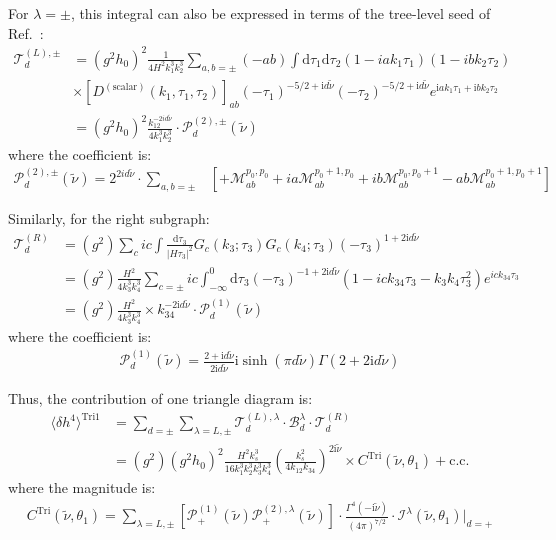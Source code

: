 \documentclass[a4paper,12pt]{article}
\def\di{{\mathrm{d}}}
\def\mc{\mathcal}
\def\la{\langle}\def\ra{\rangle}
\def\ii{\mathrm{i}}
\def\lam{\lambda}
\def\tn{\tilde\nu}
\begin{document}
For $\lambda=\pm$, this integral can also be expressed in terms of the tree-level seed of Ref.~\cite{qin_closed-form_2023}:
\begin{align}
    \mathcal{T}^{(L),\pm}_d 
    &= (g^2h_0)^2  
    \frac{1}{4H^2k_1^3 k_2^3}
    \sum_{a,b=\pm} (-ab)
    \int \di \tau_1 \di \tau_2 
    (1-iak_1\tau_1)(1-ibk_2\tau_2)
    \nonumber \\
    &\times \left[D^{(\text{scalar})}(k_1,\tau_1,\tau_2)\right]_{ab} 
    (-\tau_1)^{-5/2+\ii d\tn}
    (-\tau_2)^{-5/2+\ii d\tn} 
    e^{\ii ak_1\tau_1 + \ii bk_2\tau_2} \\
    &= \left( g^2h_0\right)^2 
    \frac{k_{12}^{-2id\tn}}{4k_1^3 k_2^3} 
    \cdot \mathcal{P}_d^{(2),\pm}(\tn)
\end{align}
where the coefficient is:
\begin{align}
    \mathcal{P}_d^{(2),\pm}(\tn)
    = 2^{2id\tn} \cdot \sum_{a,b=\pm}
    &\left[ +{\mathcal{M}}_{ab}^{p_0,p_0}
    + ia {\mathcal{M}}_{ab}^{p_0+1,p_0}
    + ib {\mathcal{M}}_{ab}^{p_0,p_0+1}
    - ab {\mathcal{M}}_{ab}^{p_0+1,p_0+1} \right]
\end{align}

Similarly, for the right subgraph:
\begin{align}
    \mathcal{T}^{(R)}_d &= (g^2) \sum_c ic \int \frac{\di \tau_3}{|H \tau_3|^2} G_c(k_3;\tau_3) G_c(k_4;\tau_3) (-\tau_3)^{1+2\ii d\tn} \nonumber \\
    &= (g^2) \frac{H^2}{4k_3^3 k_4^3} \sum_{c=\pm} ic \int_{-\infty}^{0} \di \tau_3 (-\tau_3)^{-1+2\ii d\tn} (1 -ick_{34}\tau_3-k_3k_4\tau_3^2) e^{ick_{34}\tau_3} \nonumber \\
    &= (g^2) \frac{H^2}{4k_3^3 k_4^3} \times k_{34}^{-2\ii d\tn} \cdot \mathcal{P}^{(1)}_d(\tn)
\end{align}
where the coefficient is:
\begin{align}
    \mathcal{P}^{(1)}_d(\tn) = \frac{2+\ii d\tn}{2\ii d\tn} \ii\sinh(\pi d \tn) \Gamma(2+2\ii d\tn)
\end{align}

Thus, the contribution of one triangle diagram is:
\begin{align}
    \la \delta h^4 \ra^{\text{Tri1}} 
    &= \sum_{d=\pm} \sum_{\lambda=L,\pm} 
    \mc T^{(L),\lambda}_d  
    \cdot \mc B^{\lam}_d 
    \cdot \mc T^{(R)}_d \\
    &= (g^2)(g^2h_0)^2 
    \frac{H^2 k_s^3}{16 k_1^3 k_2^3 k_3^3 k_4^3} 
    \left( \frac{k_s^2}{4k_{12}k_{34}}\right)^{2\ii\tn} 
    \times C^{\text{Tri}}(\tn,\theta_1) + \text{c.c.}
\end{align}
where the magnitude is:
\begin{align}
    C^{\text{Tri}}(\tn,\theta_1) = 
    \sum_{\lam=L,\pm}
    [\mathcal{P}^{(1)}_+(\tn) \mc P^{(2),\lambda}_+(\tn) ]
    \cdot \frac{\Gamma^4(-\ii \tn)}{(4\pi)^{7/2}} \cdot 
    \mathcal{I}^{\lambda}(\tn,\theta_1)|_{d=+}
\end{align}
\end{document}
